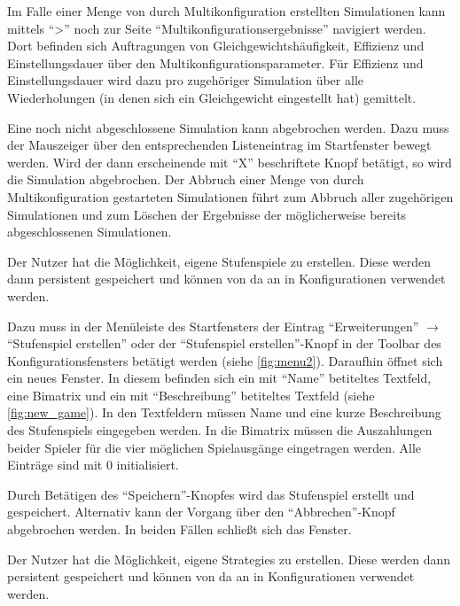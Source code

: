 \documentclass[parskip=full,11pt]{scrartcl}
\begin{document}
Im Falle einer Menge von durch Multikonfiguration erstellten Simulationen kann mittels \enquote{>} noch zur Seite \enquote{Multikonfigurationsergebnisse} navigiert werden. Dort befinden sich Auftragungen von Gleichgewichtshäufigkeit, \Gls{Effizienz} und \Gls{Einstellungsdauer} über den Multikonfigurationsparameter. Für \Gls{Effizienz} und \Gls{Einstellungsdauer} wird dazu pro zugehöriger Simulation über alle Wiederholungen (in denen sich ein Gleichgewicht eingestellt hat) gemittelt.

Eine noch nicht abgeschlossene Simulation kann abgebrochen werden. Dazu muss der Mauszeiger über den entsprechenden Listeneintrag im Startfenster bewegt werden. Wird der dann erscheinende mit \enquote{X} beschriftete Knopf betätigt, so wird die Simulation abgebrochen. Der Abbruch einer Menge von durch Multikonfiguration gestarteten Simulationen führt zum Abbruch aller zugehörigen Simulationen und zum Löschen der Ergebnisse der möglicherweise bereits abgeschlossenen Simulationen.

Der \Gls{Nutzer} hat die Möglichkeit, eigene Stufenspiele zu erstellen. Diese werden dann persistent gespeichert und können von da an in Konfigurationen verwendet werden.

Dazu muss in der Menüleiste des Startfensters der Eintrag \enquote{Erweiterungen} \(\rightarrow\) \enquote{Stufenspiel erstellen} oder der \enquote{Stufenspiel erstellen}-Knopf in der Toolbar des Konfigurationsfensters betätigt werden (siehe \cref{fig:menu2}). Daraufhin öffnet sich ein neues Fenster. In diesem befinden sich ein mit \enquote{Name} betiteltes Textfeld, eine Bimatrix und ein mit \enquote{Beschreibung} betiteltes Textfeld (siehe \cref{fig:new_game}). In den Textfeldern müssen Name und eine kurze Beschreibung des Stufenspiels eingegeben werden. In die Bimatrix müssen die Auszahlungen beider Spieler für die vier möglichen Spielausgänge eingetragen werden. Alle Einträge sind mit \(0\) initialisiert.

Durch Betätigen des \enquote{Speichern}-Knopfes wird das Stufenspiel erstellt und gespeichert. Alternativ kann der Vorgang über den \enquote{Abbrechen}-Knopf abgebrochen werden. In beiden Fällen schließt sich das Fenster.

Der \Gls{Nutzer} hat die Möglichkeit, eigene \Glspl{Strategie} zu erstellen. Diese werden dann persistent gespeichert und können von da an in Konfigurationen verwendet werden.
\end{document}
